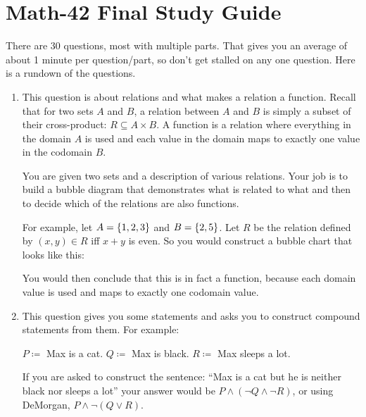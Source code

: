 \documentclass[letterpaper,12pt,fleqn]{article}
\begin{document}
\section*{Math-42 Final Study Guide}

There are 30 questions, most with multiple parts.  That gives you an average of about 1 minute per question/part,
so don't get stalled on any one question.  Here is a rundown of the questions.

\begin{enumerate}[left=0in]
\item This question is about relations and what makes a relation a function.  Recall that for two sets \(A\) and
  \(B\), a relation between \(A\) and \(B\) is simply a subset of their cross-product: \(R\subseteq A\times B\).
  A function is a relation where everything in the domain \(A\) is used and each value in the domain maps to
  exactly one value in the codomain \(B\).

  You are given two sets and a description of various relations.  Your job is to build a bubble diagram that
  demonstrates what is related to what and then to decide which of the relations are also functions.

  For example, let \(A=\{1,2,3\}\) and \(B=\{2,5\}\).  Let \(R\) be the relation defined by
  \((x,y)\in R\) iff \(x+y\) is even.  So you would construct a bubble chart that looks like this:


  You would then conclude that this is in fact a function, because each domain value is used and maps to exactly
  one codomain value.

\item This question gives you some statements and asks you to construct compound statements from them.  For
  example:

  \(P\coloneq\) Max is a cat.
  \(Q\coloneq\) Max is black.
  \(R\coloneq\) Max sleeps a lot.

  If you are asked to construct the sentence: ``Max is a cat but he is neither black nor sleeps a lot'' your
  answer would be \(P\land(\lnot Q\land\lnot R)\), or using DeMorgan, \(P\land\lnot(Q\lor R)\).


\end{enumerate}
\end{document}
